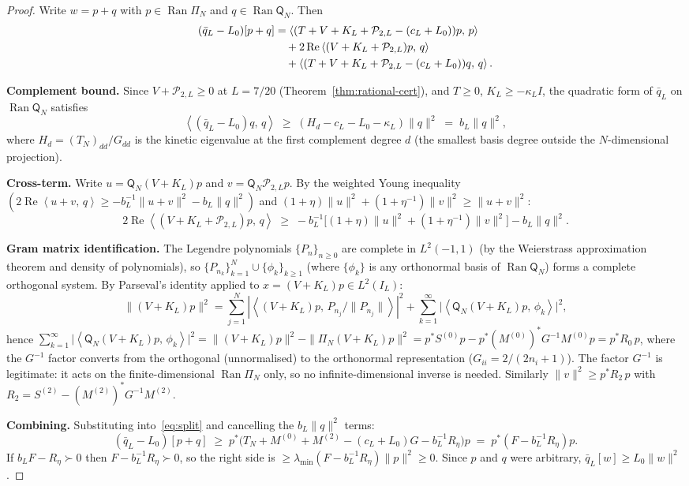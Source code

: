 \documentclass[12pt,a4paper]{amsart}
\theoremstyle{plain}
\theoremstyle{definition}
\newcommand{\qbar}{\bar{q}}
\newcommand{\Lzero}{L_0}             %
\newcommand{\ip}[2]{\left\langle #1,\, #2\right\rangle}
\begin{document}
\begin{proof}
Write $w = p + q$ with $p \in \operatorname{Ran}\Pi_N$ and
$q \in \operatorname{Ran}\mathsf{Q}_N$.
Then
\begin{align}\label{eq:split}
  (\qbar_L - \Lzero)[p+q]
  &= \ip{(T + V + K_L + \mathcal{P}_{2,L} - (c_L+\Lzero))p}{p} \notag\\
  &\quad + 2\operatorname{Re}\ip{(V+K_L+\mathcal{P}_{2,L})p}{q} \notag\\
  &\quad + \ip{(T + V + K_L + \mathcal{P}_{2,L} - (c_L+\Lzero))q}{q}.
\end{align}

\textbf{Complement bound.}
Since $V + \mathcal{P}_{2,L} \ge 0$ at $L=7/20$ (Theorem~\ref{thm:rational-cert}),
and $T \ge 0$, $K_L \ge -\kappa_L I$, the quadratic form of $\qbar_L$ on
$\operatorname{Ran}\mathsf{Q}_N$ satisfies
\[
  \ip{(\qbar_L - \Lzero)q}{q}
  \;\ge\; (H_d - c_L - \Lzero - \kappa_L)\|q\|^2
  \;=\; b_L\|q\|^2,
\]
where $H_d = (T_N)_{dd}/G_{dd}$ is the kinetic eigenvalue at the first
complement degree $d$ (the smallest basis degree outside the $N$-dimensional
projection).

\textbf{Cross-term.}
Write $u = \mathsf{Q}_N(V+K_L)p$ and $v = \mathsf{Q}_N\mathcal{P}_{2,L}p$.
By the weighted Young inequality $(2\operatorname{Re}\ip{u+v}{q}
\ge -b_L^{-1}\|u+v\|^2 - b_L\|q\|^2)$
and $(1+\eta)\|u\|^2 + (1+\eta^{-1})\|v\|^2 \ge \|u+v\|^2$:
\[
  2\operatorname{Re}\ip{(V+K_L+\mathcal{P}_{2,L})p}{q}
  \;\ge\; -b_L^{-1}\bigl[(1+\eta)\|u\|^2 + (1+\eta^{-1})\|v\|^2\bigr]
          - b_L\|q\|^2.
\]

\textbf{Gram matrix identification.}
The Legendre polynomials $\{P_n\}_{n\ge0}$ are complete in $L^2(-1,1)$
(by the Weierstrass approximation theorem and density of polynomials),
so $\{P_{n_k}\}_{k=1}^N \cup \{\phi_k\}_{k\ge1}$ (where $\{\phi_k\}$ is
any orthonormal basis of $\operatorname{Ran}\mathsf{Q}_N$) forms a complete
orthogonal system.
By Parseval's identity applied to $x = (V+K_L)p \in L^2(I_L)$:
\[
  \|(V+K_L)p\|^2 = \sum_{j=1}^N |\ip{(V+K_L)p}{P_{n_j}/\|P_{n_j}\|}|^2
                 + \sum_{k=1}^\infty \bigl|\ip{\mathsf{Q}_N(V+K_L)p}{\phi_k}\bigr|^2,
\]
hence $\sum_{k=1}^\infty \bigl|\ip{\mathsf{Q}_N(V+K_L)p}{\phi_k}\bigr|^2
  = \|(V+K_L)p\|^2 - \|\Pi_N(V+K_L)p\|^2
  = p^* S^{(0)} p - p^* (M^{(0)})^* G^{-1} M^{(0)} p
  = p^* R_0\, p$,
where the $G^{-1}$ factor converts from the orthogonal (unnormalised)
to the orthonormal representation ($G_{ii} = 2/(2n_i+1)$).
The factor $G^{-1}$ is legitimate: it acts on the finite-dimensional
$\operatorname{Ran}\Pi_N$ only, so no infinite-dimensional inverse is needed.
Similarly $\|v\|^2 \ge p^* R_2\, p$ with $R_2 = S^{(2)} - (M^{(2)})^* G^{-1} M^{(2)}$.

\textbf{Combining.}
Substituting into~\eqref{eq:split} and cancelling the $b_L\|q\|^2$ terms:
\[
  (\qbar_L - \Lzero)[p+q]
  \;\ge\; p^*\bigl(T_N + M^{(0)} + M^{(2)} - (c_L+\Lzero)G
                   - b_L^{-1}R_\eta\bigr)p
  \;=\; p^*(F - b_L^{-1}R_\eta)p.
\]
If $b_L F - R_\eta \succ 0$ then $F - b_L^{-1}R_\eta \succ 0$,
so the right side is $\ge \lambda_{\min}(F-b_L^{-1}R_\eta)\|p\|^2 \ge 0$.
Since $p$ and $q$ were arbitrary, $\qbar_L[w] \ge \Lzero\|w\|^2$.
\end{proof}
\end{document}
